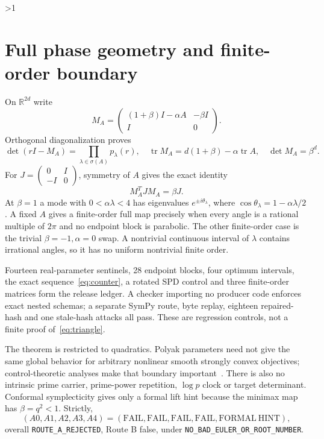 \documentclass[9pt]{extarticle}
\begin{document}
\ifnum\CRevisionRound>1
\section{Full phase geometry and finite-order boundary}
On $\mathbb R^{2d}$ write
\[
 M_A=\begin{pmatrix}(1+\beta)I-\alpha A&-\beta I\\I&0\end{pmatrix}.
\]
Orthogonal diagonalization proves
\[
 \det(rI-M_A)=\prod_{\lambda\in\sigma(A)}p_\lambda(r),\quad
 \operatorname{tr}M_A=d(1+\beta)-\alpha\operatorname{tr}A,
 \quad\det M_A=\beta^d.
\]
For $J=\left(\begin{smallmatrix}0&I\\-I&0\end{smallmatrix}\right)$, symmetry of
$A$ gives the exact identity
\begin{equation}\label{eq:conformal}M_A^TJM_A=\beta J.\end{equation}
At $\beta=1$ a mode with $0<\alpha\lambda<4$ has eigenvalues
$e^{\pm i\theta_\lambda}$, where
$\cos\theta_\lambda=1-\alpha\lambda/2$.  A fixed $A$ gives a finite-order full
map precisely when every angle is a rational multiple of $2\pi$ and no
endpoint block is parabolic.  The other finite-order case is the trivial
$\beta=-1,\alpha=0$ swap.  A nontrivial continuous interval of $\lambda$
contains irrational angles, so it has no uniform nontrivial finite order.

Fourteen real-parameter sentinels, 28 endpoint blocks, four optimum intervals,
the exact sequence~\eqref{eq:counter}, a rotated SPD control and three
finite-order matrices form the release ledger.  A checker importing no
producer code enforces exact nested schemas; a separate SymPy route, byte
replay, eighteen repaired-hash and one stale-hash attacks all pass.  These are
regression controls, not a finite proof of~\eqref{eq:triangle}.

The theorem is restricted to quadratics.  Polyak parameters need not give the
same global behavior for arbitrary nonlinear smooth strongly convex
objectives; control-theoretic analyses make that boundary important~\cite{LRP16}.
There is also no intrinsic prime carrier, prime-power repetition, $\log p$
clock or target determinant.  Conformal symplecticity gives only a formal lift
hint because the minimax map has $\beta=q^2<1$.  Strictly,
\[
 (A0,A1,A2,A3,A4)=(\mathrm{FAIL},\mathrm{FAIL},\mathrm{FAIL},
 \mathrm{FAIL},\mathrm{FORMAL\ HINT}),
\]
overall \texttt{ROUTE\_A\_REJECTED}, Route B false, under
\texttt{NO\_BAD\_EULER\_OR\_ROOT\_NUMBER}.
\end{document}
